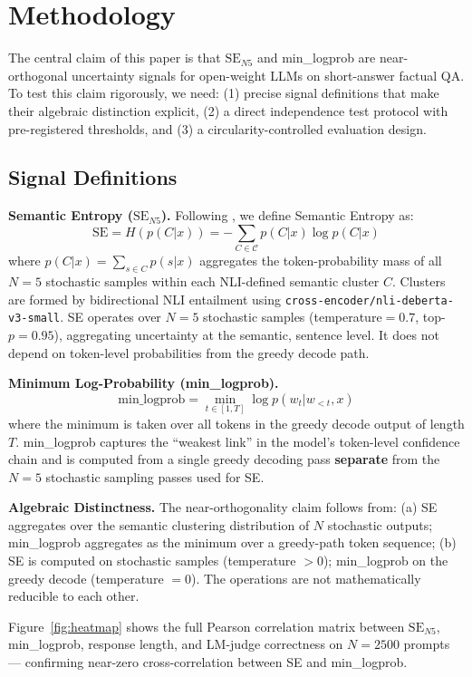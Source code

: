 \section{Methodology}
\label{sec:method}

The central claim of this paper is that $\text{SE}_{N5}$ and min\_logprob are near-orthogonal uncertainty signals for open-weight LLMs on short-answer factual QA. To test this claim rigorously, we need: (1) precise signal definitions that make their algebraic distinction explicit, (2) a direct independence test protocol with pre-registered thresholds, and (3) a circularity-controlled evaluation design.

\subsection{Signal Definitions}

\textbf{Semantic Entropy ($\text{SE}_{N5}$).} Following \citet{kuhn2023semantic}, we define Semantic Entropy as:
\[
\text{SE} = H(p(C|x)) = -\sum_{C \in \mathcal{C}} p(C|x) \log p(C|x)
\]
where $p(C|x) = \sum_{s \in C} p(s|x)$ aggregates the token-probability mass of all $N=5$ stochastic samples within each NLI-defined semantic cluster $C$. Clusters are formed by bidirectional NLI entailment using \texttt{cross-encoder/nli-deberta-v3-small}. SE operates over $N=5$ stochastic samples (temperature$=0.7$, top-$p=0.95$), aggregating uncertainty at the semantic, sentence level. It does not depend on token-level probabilities from the greedy decode path.

\textbf{Minimum Log-Probability (min\_logprob).}
\[
\text{min\_logprob} = \min_{t \in [1,T]} \log p(w_t | w_{<t}, x)
\]
where the minimum is taken over all tokens in the greedy decode output of length $T$. min\_logprob captures the ``weakest link'' in the model's token-level confidence chain and is computed from a single greedy decoding pass \textbf{separate} from the $N=5$ stochastic sampling passes used for SE.

\textbf{Algebraic Distinctness.} The near-orthogonality claim follows from: (a) SE aggregates over the semantic clustering distribution of $N$ stochastic outputs; min\_logprob aggregates as the minimum over a greedy-path token sequence; (b) SE is computed on stochastic samples (temperature $> 0$); min\_logprob on the greedy decode (temperature $= 0$). The operations are not mathematically reducible to each other.

Figure~\ref{fig:heatmap} shows the full Pearson correlation matrix between $\text{SE}_{N5}$, min\_logprob, response length, and LM-judge correctness on $N=2500$ prompts --- confirming near-zero cross-correlation between SE and min\_logprob.

